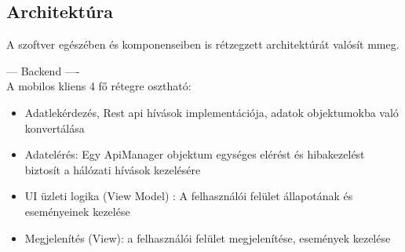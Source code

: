\subsection{Architektúra}

A szoftver egészében és komponenseiben is rétzegzett architektúrát valósít mmeg.

--- Backend ----
\\




\noindent A mobilos kliens 4 fő rétegre osztható:

\begin{itemize}
    \item  Adatlekérdezés, Rest api hívások implementációja, adatok objektumokba való konvertálása
    \item  Adatelérés: Egy ApiManager objektum  egységes elérést és hibakezelést biztosít a hálózati hívások kezelésére
    \item  UI üzleti logika (View Model) : A felhasználói felület állapotának és eseményeinek kezelése
    \item  Megjelenítés (View): a felhasználói felület megjelenítése, események kezelése
\end{itemize}